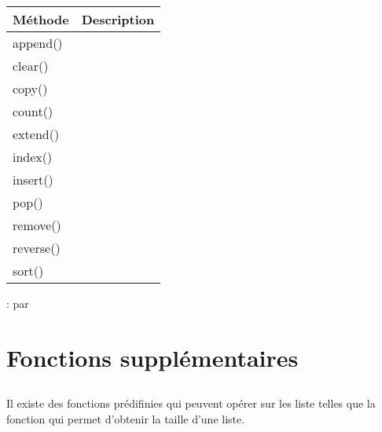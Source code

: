 \documentclass[letterpaper,10pt,english]{sphinxmanual}
\begin{document}
\begin{savenotes}\sphinxattablestart
\centering
\begin{tabulary}{\linewidth}[t]{|T|T|}
\hline
\sphinxstyletheadfamily 
Méthode
&\sphinxstyletheadfamily 
Description
\\
\hline
append()
&

\\
\hline
clear()
&

\\
\hline
copy()
&

\\
\hline
count()
&

\\
\hline
extend()
&

\\
\hline
index()
&

\\
\hline
insert()
&

\\
\hline
pop()
&

\\
\hline
remove()
&

\\
\hline
reverse()
&

\\
\hline
sort()
&

\\
\hline
\end{tabulary}
\par
\sphinxattableend\end{savenotes}

 : par 


\section{Fonctions supplémentaires}
\label{\detokenize{src/OCI02_Listes:fonctions-supplementaires}}

\subsection{}
\label{\detokenize{src/OCI02_Listes:len}}
Il existe des fonctions prédifinies qui peuvent opérer sur les liste telles que la fonction  qui permet d’obtenir la taille d’une liste.

\begin{sphinxVerbatim}[commandchars=\\\{\}]
\end{sphinxVerbatim}
\end{document}
